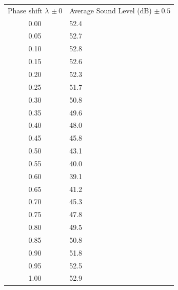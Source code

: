 \documentclass[index]{subfiles}
\begin{document}
\begin{table}[H]
    \centering
    \begin{tabularx}{0.6\textwidth}{c|X}
        Phase shift \(\lambda\) \(\pm\ 0\) & Average Sound Level (dB) \(\pm\ 0.5\) \\
        0.00                               & 52.4                                  \\
        0.05                               & 52.7                                  \\
        0.10                               & 52.8                                  \\
        0.15                               & 52.6                                  \\
        0.20                               & 52.3                                  \\
        0.25                               & 51.7                                  \\
        0.30                               & 50.8                                  \\
        0.35                               & 49.6                                  \\
        0.40                               & 48.0                                  \\
        0.45                               & 45.8                                  \\
        0.50                               & 43.1                                  \\
        0.55                               & 40.0                                  \\
        0.60                               & 39.1                                  \\
        0.65                               & 41.2                                  \\
        0.70                               & 45.3                                  \\
        0.75                               & 47.8                                  \\
        0.80                               & 49.5                                  \\
        0.85                               & 50.8                                  \\
        0.90                               & 51.8                                  \\
        0.95                               & 52.5                                  \\
        1.00                               & 52.9                                  \\
    \end{tabularx}
\end{table}
\end{document}
